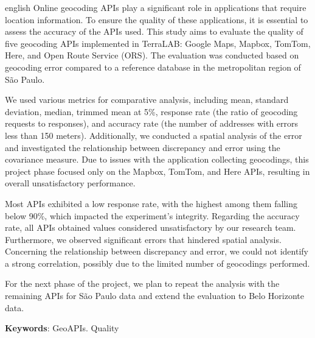 \begin{resumo}[Abstract]
 \begin{otherlanguage*}{english}
   Online geocoding APIs play a significant role in applications that require location information. To ensure the quality of these applications, it is essential to assess the accuracy of the APIs used. This study aims to evaluate the quality of five geocoding APIs implemented in TerraLAB: Google Maps, Mapbox, TomTom, Here, and Open Route Service (ORS). The evaluation was conducted based on geocoding error compared to a reference database in the metropolitan region of São Paulo.

    We used various metrics for comparative analysis, including mean, standard deviation, median, trimmed mean at 5\%, response rate (the ratio of geocoding requests to responses), and accuracy rate (the number of addresses with errors less than 150 meters). Additionally, we conducted a spatial analysis of the error and investigated the relationship between discrepancy and error using the covariance measure. Due to issues with the application collecting geocodings, this project phase focused only on the Mapbox, TomTom, and Here APIs, resulting in overall unsatisfactory performance.
    
    Most APIs exhibited a low response rate, with the highest among them falling below 90\%, which impacted the experiment's integrity. Regarding the accuracy rate, all APIs obtained values considered unsatisfactory by our research team. Furthermore, we observed significant errors that hindered spatial analysis. Concerning the relationship between discrepancy and error, we could not identify a strong correlation, possibly due to the limited number of geocodings performed.
    
    For the next phase of the project, we plan to repeat the analysis with the remaining APIs for São Paulo data and extend the evaluation to Belo Horizonte data.


   \vspace{\onelineskip}
   \noindent 
   \textbf{Keywords}: GeoAPIs. Quality
 \end{otherlanguage*}
\end{resumo}